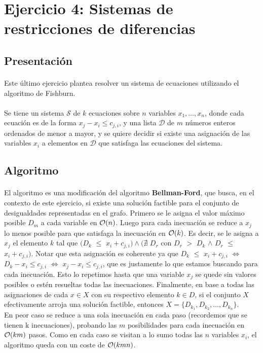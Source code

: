 \documentclass[../main.tex]{subfiles}
\begin{document}
\section{Ejercicio 4: Sistemas de restricciones de diferencias}

\subsection{Presentación}
\label{sec:ej4-intro}
\paragraph{} Este último ejercicio plantea resolver un sistema de ecuaciones utilizando el algoritmo de Fishburn.

\paragraph{} Se tiene un sistema \(\mathcal{S}\) de \(k\) ecuaciones sobre \(n\) variables \(x_{1}, \ldots, x_{n}\), donde cada ecuación es de la forma \(x_{j} - x_{i} \leq c_{j,i}\), y una lista \(\mathcal{D}\) de \(m\) números enteros ordenados de menor a mayor, y se quiere decidir si existe una asignación de las variables \(x_{i}\) a elementos en \(\mathcal{D}\) que satisfaga las ecuaciones del sistema.

\subsection{Algoritmo}
\label{sec:ej4-algo}
\paragraph{} El algoritmo es una modificación del algoritmo \textbf{Bellman-Ford}, que busca, en el contexto de este ejercicio, si existe una soluci\'on factible para el conjunto de desigualdades representadas en el grafo. Primero se le asigna el valor máximo posible \(D_{m}\) a cada variable en \(\mathcal{O}(n)\). Luego para cada inecuación se reduce a \(x_{j}\) lo menos posible para que satisfaga la inecuación en \(\mathcal{O}(k)\). Es decir, se le asigna a $x_j$ el elemento $k$ tal que $(D_k$ $\leq$ $x_i + c_{j,i}) \land (\nexists$ $D_r$ con $D_r$ $>$ $D_k$ $\land$ $D_r$ $\leq$ $x_i + c_{j,i})$. Notar que esta asignaci\'on es coherente ya que $D_k$ $\leq$ $x_i + c_{j,i}$ $\iff$ $D_k - x_i \leq c_{j,i}$ $\iff$ $x_j - x_i \leq c_{j,i}$, que es justamente lo que estamos buscando para cada inecuaci\'on. Esto lo repetimos hasta que una variable \(x_{j}\) se quede sin valores posibles o estén resueltas todas las inecuaciones. Finalmente, en base a todas las asignaciones de cada $x \in X$ con su respectivo elemento $k \in D$, si el conjunto $X$ efectivamente arroja una soluci\'on factible, entonces $X = \lbrace D_{k_1}, D_{k_2}, ..., D_{k_n} \rbrace$. \\
En peor caso se reduce a una sola inecuación en cada paso (recordemos que se tienen k inecuaciones), probando las \(m\) posibilidades para cada inecuación en \(\mathcal{O}(km)\) pasos. Como en cada caso se visitan a lo sumo todas las $n$ variables $x_i$, el algoritmo queda con un coste de \(\mathcal{O}(kmn)\).
\end{document}
